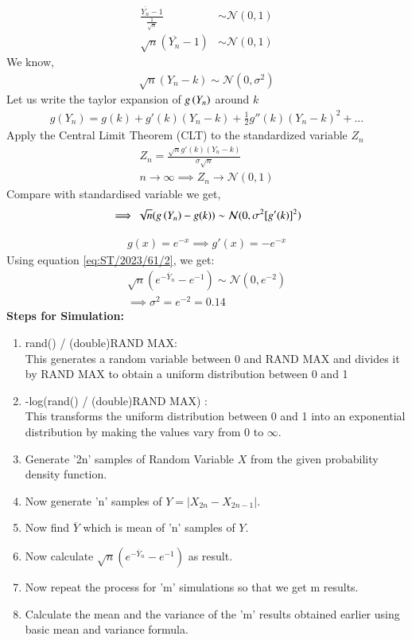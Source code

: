 \documentclass[journal,12pt,twocolumn]{IEEEtran}
\begin{document}
\begin{enumerate}
\begin{align}
\frac{\overline{Y_n} - 1}{\frac{1}{\sqrt{n}}} &\sim \mathcal{N}(0, 1) \\
\sqrt{n} (\overline{Y_n}- 1) &\sim \mathcal{N}(0, 1) 
\end{align}
We know,
\begin{align}
\sqrt{n} (Y_n - k) \sim \mathcal{N}(0,\sigma^2) 
\end{align}
Let us write the taylor expansion of $g\left(Y_n\right)$ around $k$
\begin{align}
g(Y_n) = g(k) + g'(k)(Y_n - k) + \frac{1}{2}g''(k)(Y_n - k)^2 + \ldots 
\end{align}
Apply the Central Limit Theorem (CLT) to the standardized variable $Z_n$ 
\begin{align}
Z_n = \frac{\sqrt{n}g'(k)(Y_n - k)}{\sigma \sqrt{n}} \\
n \to \infty \implies Z_n \xrightarrow{} \mathcal{N}(0, 1)
\end{align}
Compare with standardised variable we get,
\begin{align}
\implies \sqrt{n} (g\brak{Y_n} - g(k)) \sim \mathcal{N}(0, \sigma^2 [g'(k)]^2) \label{eq:ST/2023/61/2}
\end{align}
\end{enumerate}
\begin{align}
g(x) = e^{-x} \implies g'(x) = -e^{-x} 
\end{align}
Using equation \eqref{eq:ST/2023/61/2}, we get:
\begin{align}
\sqrt{n} (e^{-\overline{Y}_n} - e^{-1}) \sim \mathcal{N}(0,e^{-2}) \\
\implies \sigma^2 = e^{-2} = 0.14 
\end{align}
\textbf{Steps for Simulation:}
\begin{enumerate}
\item  rand() / (double)RAND MAX: \\
This generates a random variable between 0 and RAND MAX and divides
it by RAND MAX to obtain a uniform distribution between 0 and 1
\item -log(rand() / (double)RAND MAX) : \\
This transforms the uniform distribution between 0 and 1 into an exponential
distribution by making the values vary from 0 to  $\infty$.
\item Generate '2n' samples of Random Variable $X$ from the given probability density function.
\item Now generate 'n' samples of $Y = |X_{2n} - X_{2n-1}| $.
\item Now find $\overline{Y}$ which is mean of 'n' samples of $Y$.
\item Now calculate $\sqrt{n} (e^{-\overline{Y}_n} - e^{-1})$ as result.
\item Now repeat the process for 'm' simulations so that we get m results.
\item Calculate the mean and the variance of the 'm' results obtained earlier using basic mean and variance formula.
\end{enumerate}
\end{document}
